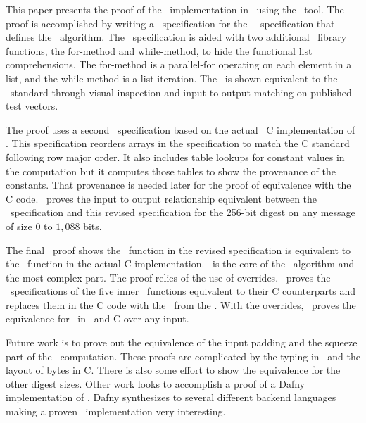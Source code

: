 This paper presents the proof of the \shaThree\ implementation in \openssl\ using the \saw\ tool.
The proof is accomplished by writing a \cryptol\ specification for the \nist\ \fips\ specification that defines the \shaThree\ algorithm.
The \cryptol\ specification is aided with two additional \cryptol\ library functions, the for-method and while-method, to hide the functional list comprehensions.
The for-method is a parallel-for operating on each element in a list, and the while-method is a list iteration.
The \cryptol\ is shown equivalent to the \fips\ standard through visual inspection and input to output matching on published test vectors.

The proof uses a second \cryptol\ specification based on the actual \openssl\ C implementation of \shaThree.
This specification reorders arrays in the specification to match the C standard following row major order.
It also includes table lookups for constant values in the computation but it computes those tables to show the provenance of the constants.
That provenance is needed later for the proof of equivalence with the C code.
\saw\ proves the input to output relationship equivalent between the \fips\ specification and this revised specification for the 256-bit digest on any message of size $0$ to $1,088$ bits.

The final \saw\ proof shows the \keccak\ function in the revised specification is equivalent to the \keccak\ function in the actual C implementation.
\keccak\ is the core of the \shaThree\ algorithm and the most complex part.
The proof relies of the use of overrides.
\saw\ proves the \cryptol\ specifications of the five inner \keccak\ functions equivalent to their C counterparts and replaces them in the C code with the \sawcore\ from the \cryptol.
With the overrides, \saw\ proves the equivalence for \keccak\ in \cryptol\ and C over any input.

Future work is to prove out the equivalence of the input padding and the squeeze part of the \shaThree\ computation.
These proofs are complicated by the typing in \cryptol\ and the layout of bytes in C.
There is also some effort to show the equivalence for the other digest sizes.
Other work looks to accomplish a proof of a Dafny implementation of \shaThree.
Dafny synthesizes to several different backend languages making a proven \shaThree\ implementation very interesting.
